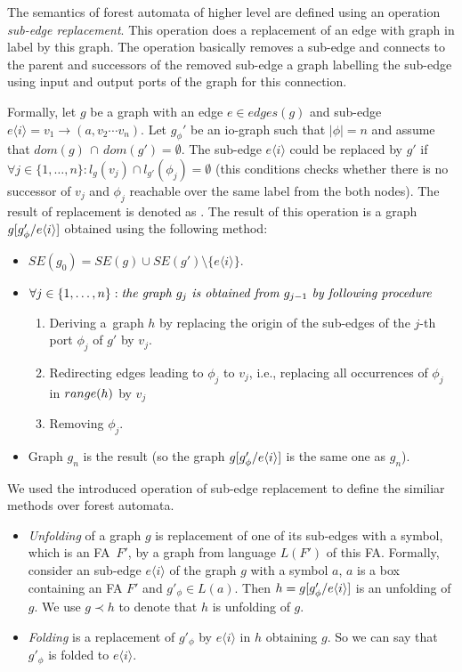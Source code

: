 \documentclass[a4paper, 12pt]{article}
\begin{document}
The semantics of forest automata of higher level are defined
using an operation \emph{sub-edge replacement}.
This operation does a replacement of an edge with graph in label
by this graph.
The operation basically removes a sub-edge and connects
to the parent and successors of the removed sub-edge a graph
labelling the sub-edge using input and output ports
of the graph for this connection.

Formally, let $g$ be a graph with an edge $e \in edges(g)$ and sub-edge $e\langle i\rangle = v_1 \rightarrow (a,v_2 \cdots v_n)$.
Let $g_{\phi}'$ be an io-graph such that $|\phi| = n$ and assume that ${dom(g)}\, \cap\, {dom(g')} = \emptyset$.
The sub-edge $e\langle i\rangle$ could be replaced by $g'$ if $\forall j \in \{1,\ldots,n\}: l_{g}(v_j) \cap
l_{g'}(\phi_j) = \emptyset$
(this conditions checks whether there is no successor of $v_j$ and $\phi_j$ reachable over the same
label from the both nodes).
The result of replacement is denoted as .
The result of this operation is a graph $g[g'_\phi/e\langle i\rangle]$
obtained using the following method:
\begin{itemize}
	\item $SE(g_0) = SE(g) \cup SE(g') \setminus \{e\langle i\rangle\}$.
	\item $\forall j \in \{1, \ldots, n\}: \emph{the graph } g_j \emph{ is obtained from } g_{j-1} \emph{ by following procedure }$
		\begin{enumerate}
			\item Deriving a~graph $h$ by replacing the origin of the sub-edges of the $j$-th port $\phi_j$ of $g'$ by $v_j$.
			\item Redirecting edges leading to $\phi_{j}$ to $v_j$, i.e., replacing all occurrences of $\phi_j$ in $range(h)$ by $v_j$
			\item Removing $\phi_j$. 
		\end{enumerate}
	\item Graph $g_n$ is the result (so the graph $g[g'_\phi/e\langle i\rangle]$ is the same one as $g_n$).
\end{itemize}

We used the introduced operation of sub-edge replacement to define
the similiar methods over forest automata.
\begin{itemize}
	\item \emph{Unfolding} of a graph $g$ is replacement of one of its sub-edges with a symbol, which is
		an FA~$F'$, by a graph from language $L(F')$ of this FA.
		Formally, consider an sub-edge $e\langle i \rangle$ of the graph $g$ with a symbol $a$,
		$a$ is a box containing an FA $F'$ and $g'_\phi \in L(a)$.
		Then $h = g [g'_\phi/e\langle i \rangle]$ is an unfolding of $g$.
		We use $g \prec h$ to denote that $h$ is unfolding of $g$.
	\item \emph{Folding} is a replacement of $g'_\phi$ by $e \langle i \rangle$ in $h$ obtaining $g$.
		So we can say that $g'_\phi$ is folded to $e \langle i \rangle$. 
\end{itemize}
\end{document}
